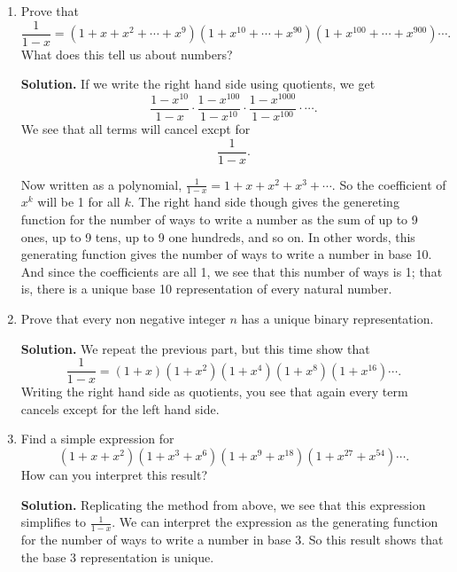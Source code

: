 \documentclass{book}
\begin{document}
\setcounter{project}{325}
\addtocounter{project}{-1}
\begin{activity}[]\label{activity-318}
\leavevmode%
\begin{enumerate}[font=\bfseries,label=(\alph*),ref=\alph*]
\item\label{task-279} \hypertarget{p-1674}{}%
Prove that%
\begin{equation*}
\frac{1}{1-x} = (1 + x + x^2 +\cdots + x^9)(1 + x^{10} + \cdots + x^{90})(1 + x^{100} + \cdots + x^{900})\cdots.
\end{equation*}
What does this tell us about numbers?%
\par\smallskip%
\noindent\textbf{Solution.}\hypertarget{solution-259}{}\quad%
\hypertarget{p-1675}{}%
If we write the right hand side using quotients, we get%
\begin{equation*}
\frac{1-x^10}{1-x}\cdot \frac{1-x^{100}}{1-x^{10}}\cdot \frac{1-x^{1000}}{1-x^{100}}\cdot\cdots.
\end{equation*}
We see that all terms will cancel excpt for%
\begin{equation*}
\frac{1}{1-x}.
\end{equation*}
%
\par
\hypertarget{p-1676}{}%
Now written as a polynomial, \(\frac{1}{1-x} = 1 + x + x^2 + x^3 + \cdots\).  So the coefficient of \(x^k\) will be 1 for all \(k\).  The right hand side though gives the genereting function for the number of ways to write a number as the sum of up to 9 ones, up to 9 tens, up to 9 one hundreds, and so on.  In other words, this generating function gives the number of ways to write a number in base 10.  And since the coefficients are all 1, we see that this number of ways is 1; that is, there is a unique base 10 representation of every natural number.%
\item\label{task-280} \hypertarget{p-1677}{}%
Prove that every non negative integer \(n\) has a unique binary representation.%
\par\smallskip%
\noindent\textbf{Solution.}\hypertarget{solution-260}{}\quad%
\hypertarget{p-1678}{}%
We repeat the previous part, but this time show that%
\begin{equation*}
\frac{1}{1-x} = (1+x)(1+x^2)(1+x^4)(1+x^8)(1+x^{16})\cdots.
\end{equation*}
Writing the right hand side as quotients, you see that again every term cancels except for the left hand side.%
\item\label{task-281} \hypertarget{p-1679}{}%
Find a simple expression for%
\begin{equation*}
(1+x+x^2)(1+x^3+x^6)(1+x^9+x^{18})(1+x^{27}+x^{54})\cdots.
\end{equation*}
How can you interpret this result?%
\par\smallskip%
\noindent\textbf{Solution.}\hypertarget{solution-261}{}\quad%
\hypertarget{p-1680}{}%
Replicating the method from above, we see that this expression simplifies to \(\frac{1}{1-x}\).  We can interpret the expression as the generating function for the number of ways to write a number in base 3.  So this result shows that the base 3 representation is unique.%
\end{enumerate}
\end{activity}
\end{document}
